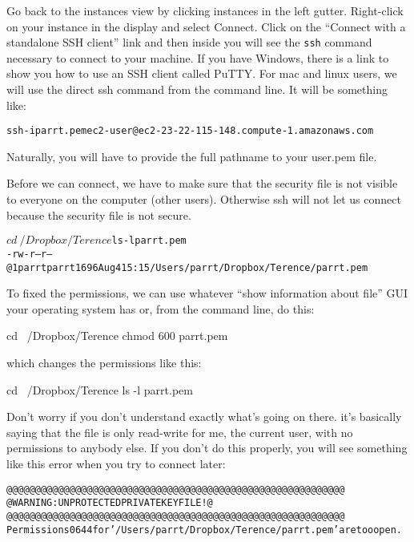\begin{fullwidth}
\step Go back to the instances view by clicking instances in the left gutter. Right-click on your instance in the display and select Connect. Click on the ``Connect with a standalone SSH client'' link and then inside you will see the {\tt ssh} command necessary to connect to your machine. If you have Windows, there is a link to show you how to use an SSH client called PuTTY. For mac and linux users, we will use the direct ssh command from the command line. It will be something like:

{\small
\begin{alltt}
ssh -i parrt.pem ec2-user@ec2-23-22-115-148.compute-1.amazonaws.com
\end{alltt}
}

\noindent Naturally, you will have to provide the full pathname to your user.pem file.

\step  Before we can connect, we have to make sure that the security file is not visible to everyone on the computer (other users). Otherwise ssh will not let us connect because the security file is not secure.

{\small
\begin{alltt}$ cd ~/Dropbox/Terence
$ ls -l parrt.pem
-rw-r--r--@ 1 parrt  parrt  1696 Aug  4 15:15 /Users/parrt/Dropbox/Terence/parrt.pem
\end{alltt}
}


\noindent To fixed the permissions, we can use whatever ``show information about file'' GUI your operating system has or, from the command line, do this:

{\small
\bash[script,stdout,prefix=$]
cd ~/Dropbox/Terence
chmod 600 parrt.pem
\END
}

\noindent which changes the permissions like this:

{\small
\bash[script,stdout,prefix=$ ]
cd ~/Dropbox/Terence
ls -l parrt.pem
\END
}

\noindent Don't worry if you don't understand exactly what's going on there. it's basically saying that the file is only read-write for me, the current user, with no permissions to anybody else. If you don't do this properly, you will see something like this error when you try to connect later:

{\small
\begin{alltt}@@@@@@@@@@@@@@@@@@@@@@@@@@@@@@@@@@@@@@@@@@@@@@@@@@@@@@@@@@@
@         WARNING: UNPROTECTED PRIVATE KEY FILE!          @
@@@@@@@@@@@@@@@@@@@@@@@@@@@@@@@@@@@@@@@@@@@@@@@@@@@@@@@@@@@
Permissions 0644 for '/Users/parrt/Dropbox/Terence/parrt.pem' are too open.
\end{alltt}
}


\end{fullwidth}
